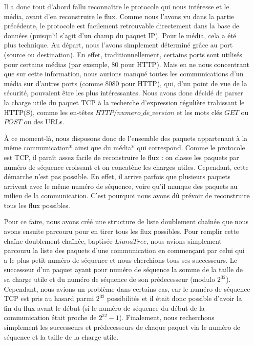 \indent Il a donc tout d'abord fallu reconnaître le protocole qui nous intéresse et le média, avant d'en reconstruire le flux. Comme nous l'avons vu 
dans la partie précédente, le protocole est facilement retrouvable directement dans la base de données (puisqu'il s'agit d'un champ du paquet IP). 
Pour le média, cela a été plus technique. Au départ, nous l'avons simplement déterminé grâce au port (source ou destination). En effet, traditionnellement,
certains ports sont utilisés pour certains médias (par exemple, 80 pour HTTP). Mais en ne nous concentrant que sur cette information, nous aurions manqué
toutes les communications d'un média sur d'autres ports (comme 8080 pour HTTP), qui, d'un point de vue de la sécurité, pouvaient être les plus intéressantes.
Nous avons donc décidé de parser la charge utile du paquet TCP à la recherche d'expression régulière trahissant le HTTP(S), comme les en-têtes
 $HTTP/numero\_de\_version$ et les mots clés $GET$ ou $POST$ ou des URLs.


\indent À ce moment-là, nous disposons donc de l'ensemble des paquets appartenant à la même communication* ainsi que du média* qui correspond. Comme le protocole est TCP,
il paraît assez facile de reconstruire le flux : on classe les paquets par numéro de séquence croissant et on concatène les charges utiles. Cependant, cette démarche 
n'est pas possible. En effet, il arrive parfois que plusieurs paquets arrivent avec le même numéro de séquence, voire qu'il manque des paquets au milieu de la communication.
C'est pourquoi nous avons dû prévoir de reconstruire tous les flux possibles.


\indent Pour ce faire, nous avons créé une structure de liste doublement chaînée que nous avons ensuite parcouru pour en tirer tous les flux possibles. Pour remplir cette chaîne
doublement chaînée, baptisée $LianaTree$, nous avions simplement parcouru la liste des paquets d'une communication en commençant par celui qui a le plus petit numéro de séquence et 
nous cherchions tous ses successeurs. Le successeur d'un paquet ayant pour numéro de séquence la somme de la taille de sa charge utile et du numéro de séquence de son prédecesseur 
(modulo $2^{32}$).
Cependant, nous avions un problème dans certains cas, car le numéro de séquence TCP est pris au hasard parmi $2^{32}$ possibilités et il était donc possible d'avoir la fin du flux 
avant le début (si le numéro de séquence du début de la communication était proche de $2^{32} -1$). Finalement, nous recherchons simplement les successeurs et prédecesseurs de chaque
paquet via le numéro de séquence et la taille de la charge utile.


